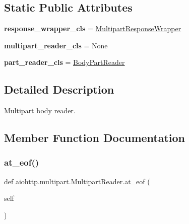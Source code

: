 \subsection*{Static Public Attributes}
\begin{DoxyCompactItemize}
\item 
\mbox{\label{classaiohttp_1_1multipart_1_1_multipart_reader_a9b008866000a804da0846b3a15eb73e4}} 
{\bfseries response\+\_\+wrapper\+\_\+cls} = \hyperlink{classaiohttp_1_1multipart_1_1_multipart_response_wrapper}{Multipart\+Response\+Wrapper}
\item 
\mbox{\label{classaiohttp_1_1multipart_1_1_multipart_reader_ad4479fdfd49351cb11a6efa3c9798ffe}} 
{\bfseries multipart\+\_\+reader\+\_\+cls} = None
\item 
\mbox{\label{classaiohttp_1_1multipart_1_1_multipart_reader_a3b49e4800d16fdcc577bfa3143f831ea}} 
{\bfseries part\+\_\+reader\+\_\+cls} = \hyperlink{classaiohttp_1_1multipart_1_1_body_part_reader}{Body\+Part\+Reader}
\end{DoxyCompactItemize}


\subsection{Detailed Description}
\begin{DoxyVerb}Multipart body reader.\end{DoxyVerb}
 

\subsection{Member Function Documentation}
\mbox{\label{classaiohttp_1_1multipart_1_1_multipart_reader_adc70dd5611b009b09ab56627ad98d82a}} 
\subsubsection{\texorpdfstring{at\+\_\+eof()}{at\_eof()}}
{\footnotesize\ttfamily def aiohttp.\+multipart.\+Multipart\+Reader.\+at\+\_\+eof (\begin{DoxyParamCaption}\item[{}]{self }\end{DoxyParamCaption})}


